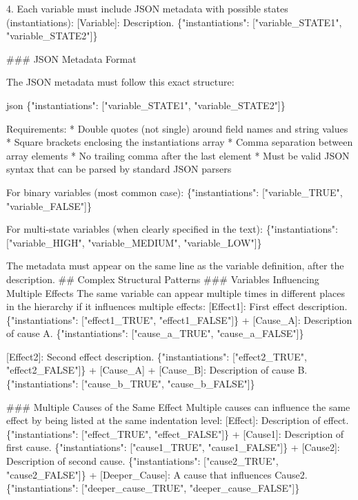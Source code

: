 \documentclass[
  11pt,
  letterpaper,
]{book}
\newenvironment{Shaded}{\begin{snugshade}}{\end{snugshade}}
\newcommand{\StringTok}[1]{\textcolor[rgb]{0.13,0.47,0.30}{#1}}
\begin{document}
\begin{Shaded}
\begin{Highlighting}[]
\StringTok{4. Each variable must include JSON metadata with possible states (instantiations):}
\StringTok{\textasciigrave{}[Variable]: Description. \{"instantiations": ["variable\_STATE1", "variable\_STATE2"]\}\textasciigrave{}}

\StringTok{\#\#\# JSON Metadata Format}

\StringTok{The JSON metadata must follow this exact structure:}

\StringTok{\textasciigrave{}\textasciigrave{}\textasciigrave{}json}
\StringTok{\{"instantiations": ["variable\_STATE1", "variable\_STATE2"]\}}

\StringTok{Requirements:}
\StringTok{* Double quotes (not single) around field names and string values}
\StringTok{* Square brackets enclosing the instantiations array}
\StringTok{* Comma separation between array elements}
\StringTok{* No trailing comma after the last element}
\StringTok{* Must be valid JSON syntax that can be parsed by standard JSON parsers}

\StringTok{For binary variables (most common case):}
\StringTok{\{"instantiations": ["variable\_TRUE", "variable\_FALSE"]\}}

\StringTok{For multi{-}state variables (when clearly specified in the text):}
\StringTok{\{"instantiations": ["variable\_HIGH", "variable\_MEDIUM", "variable\_LOW"]\}}

\StringTok{The metadata must appear on the same line as the variable definition, after the description.}
\StringTok{\#\# Complex Structural Patterns}
\StringTok{\#\#\# Variables Influencing Multiple Effects}
\StringTok{The same variable can appear multiple times in different places in the hierarchy if it influences multiple effects:}
\StringTok{[Effect1]: First effect description. \{"instantiations": ["effect1\_TRUE", "effect1\_FALSE"]\}}
\StringTok{  + [Cause\_A]: Description of cause A. \{"instantiations": ["cause\_a\_TRUE", "cause\_a\_FALSE"]\}}

\StringTok{[Effect2]: Second effect description. \{"instantiations": ["effect2\_TRUE", "effect2\_FALSE"]\}}
\StringTok{  + [Cause\_A]}
\StringTok{  + [Cause\_B]: Description of cause B. \{"instantiations": ["cause\_b\_TRUE", "cause\_b\_FALSE"]\}}

\StringTok{\#\#\# Multiple Causes of the Same Effect}
\StringTok{Multiple causes can influence the same effect by being listed at the same indentation level:}
\StringTok{[Effect]: Description of effect. \{"instantiations": ["effect\_TRUE", "effect\_FALSE"]\}}
\StringTok{  + [Cause1]: Description of first cause. \{"instantiations": ["cause1\_TRUE", "cause1\_FALSE"]\}}
\StringTok{  + [Cause2]: Description of second cause. \{"instantiations": ["cause2\_TRUE", "cause2\_FALSE"]\}}
\StringTok{    + [Deeper\_Cause]: A cause that influences Cause2. \{"instantiations": ["deeper\_cause\_TRUE", "deeper\_cause\_FALSE"]\}}


\end{Highlighting}
\end{Shaded}
\end{document}
